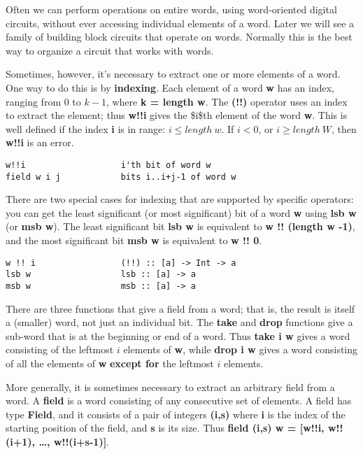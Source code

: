 \documentclass[11pt]{article}
\begin{document}
\begin{enumerate}
Often we can perform operations on entire words, using word-oriented
digital circuits, without ever accessing individual elements of a
word.  Later we will see a family of building block circuits that
operate on words.  Normally this is the best way to organize a circuit
that works with words.

Sometimes, however, it's necessary to extract one or more elements of
a word.  One way to do this is by \textbf{indexing}.  Each element of a
word \textbf{w} has an index, ranging from 0 to \(k-1\), where \textbf{k = length w}.
The \textbf{(!!)} operator uses an index to extract the element; thus \textbf{w!!i}
gives the \$i\$th element of the word \textbf{w}.  This is well defined if the
index \textbf{i} is in range: \(i \leq length\ w\).  If \(i<0\), or \(i \geq
length\  W\), then \textbf{w!!i} is an error.



\begin{verbatim}
w!!i                   i'th bit of word w
field w i j            bits i..i+j-1 of word w
\end{verbatim}

There are two special cases for indexing that are supported by
specific operators: you can get the least significant (or most
significant) bit of a word \textbf{w} using \textbf{lsb w} (or \textbf{msb w}).  The least
significant bit \textbf{lsb w} is equivalent to \textbf{w !! (length w -1)}, and the
most significant bit \textbf{msb w} is equivalent to \textbf{w !! 0}.


\begin{verbatim}
w !! i                 (!!) :: [a] -> Int -> a
lsb w                  lsb :: [a] -> a
msb w                  msb :: [a] -> a
\end{verbatim}


There are three functions that give a field from a word; that is, the
result is itself a (smaller) word, not just an individual bit.  The
\textbf{take} and \textbf{drop} functions give a sub-word that is at the beginning
or end of a word.  Thus \textbf{take i w} gives a word consisting of the
leftmost \(i\) elements of \textbf{w}, while \textbf{drop i w} gives a word consisting
of all the elements of \textbf{w} \textbf{except for} the leftmost \(i\)
elements.

More generally, it is sometimes necessary to extract an arbitrary
field from a word.  A \textbf{field} is a word consisting of any
consecutive set of elements.  A field has type \textbf{Field}, and it
consists of a pair of integers \textbf{(i,s)} where \textbf{i} is the index of the
starting position of the field, and \textbf{s} is its size.  Thus \textbf{field
(i,s) w = [w!!i, w!!(i+1), \ldots{}, w!!(i+s-1)]}.




\end{enumerate}
\end{document}
